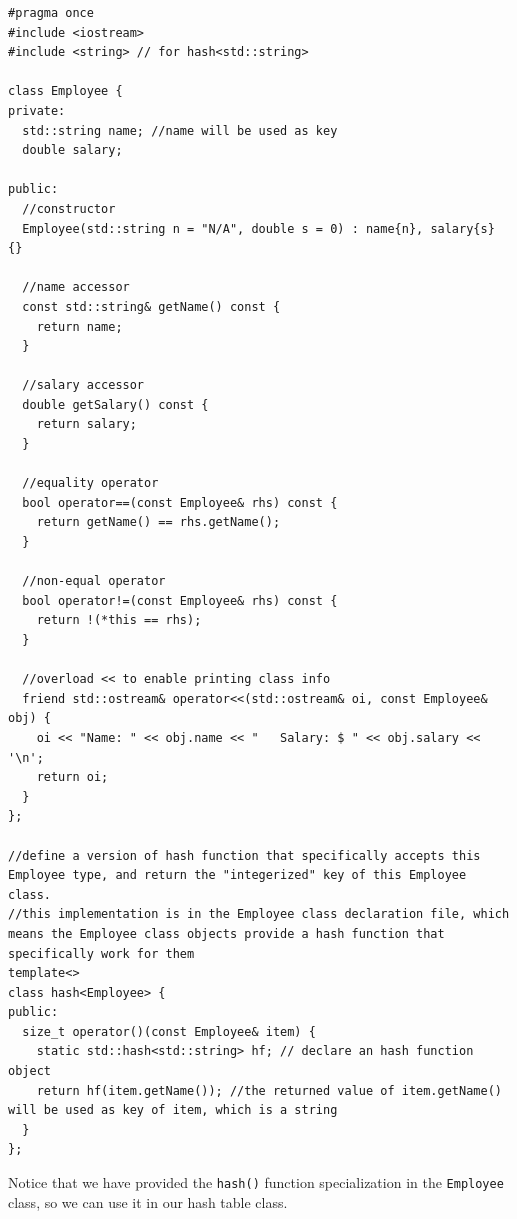 \documentclass[11pt]{book}
\begin{document}
\begin{verbatim}
#pragma once
#include <iostream>
#include <string> // for hash<std::string>

class Employee {
private:
  std::string name; //name will be used as key
  double salary;

public:
  //constructor
  Employee(std::string n = "N/A", double s = 0) : name{n}, salary{s} {}

  //name accessor
  const std::string& getName() const {
    return name;
  }

  //salary accessor 
  double getSalary() const {
    return salary;
  }

  //equality operator
  bool operator==(const Employee& rhs) const {
    return getName() == rhs.getName();
  }

  //non-equal operator
  bool operator!=(const Employee& rhs) const {
    return !(*this == rhs);
  }

  //overload << to enable printing class info
  friend std::ostream& operator<<(std::ostream& oi, const Employee& obj) {
    oi << "Name: " << obj.name << "   Salary: $ " << obj.salary << '\n';
    return oi;
  } 
};

//define a version of hash function that specifically accepts this Employee type, and return the "integerized" key of this Employee class.
//this implementation is in the Employee class declaration file, which means the Employee class objects provide a hash function that specifically work for them
template<>
class hash<Employee> {
public:
  size_t operator()(const Employee& item) {
    static std::hash<std::string> hf; // declare an hash function object 
    return hf(item.getName()); //the returned value of item.getName() will be used as key of item, which is a string
  }
};
\end{verbatim}

Notice that we have provided the \texttt{hash()} function specialization in the \texttt{Employee} class, so we can use it in our hash table class.
\end{document}
